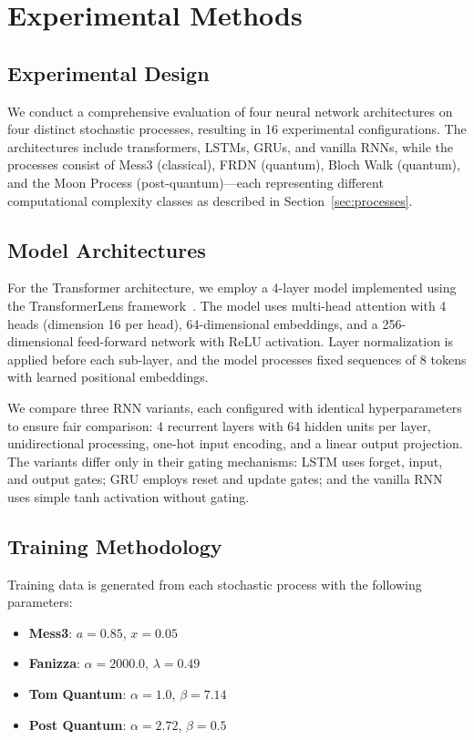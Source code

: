\section{Experimental Methods}

\subsection{Experimental Design}

We conduct a comprehensive evaluation of four neural network architectures on four distinct stochastic processes, resulting in 16 experimental configurations. The architectures include transformers, LSTMs, GRUs, and vanilla RNNs, while the processes consist of Mess3 (classical), FRDN (quantum), Bloch Walk (quantum), and the Moon Process (post-quantum)---each representing different computational complexity classes as described in Section~\ref{sec:processes}.

\subsection{Model Architectures}

For the Transformer architecture, we employ a 4-layer model implemented using the TransformerLens framework~\citep{nanda2022transformerlens}. The model uses multi-head attention with 4 heads (dimension 16 per head), 64-dimensional embeddings, and a 256-dimensional feed-forward network with ReLU activation. Layer normalization is applied before each sub-layer, and the model processes fixed sequences of 8 tokens with learned positional embeddings.

We compare three RNN variants, each configured with identical hyperparameters to ensure fair comparison: 4 recurrent layers with 64 hidden units per layer, unidirectional processing, one-hot input encoding, and a linear output projection. The variants differ only in their gating mechanisms: LSTM uses forget, input, and output gates; GRU employs reset and update gates; and the vanilla RNN uses simple tanh activation without gating.

\subsection{Training Methodology}

Training data is generated from each stochastic process with the following parameters:
\begin{itemize}
    \item \textbf{Mess3}: $a=0.85$, $x=0.05$
    \item \textbf{Fanizza}: $\alpha=2000.0$, $\lambda=0.49$  
    \item \textbf{Tom Quantum}: $\alpha=1.0$, $\beta=7.14$
    \item \textbf{Post Quantum}: $\alpha=2.72$, $\beta=0.5$
\end{itemize}

